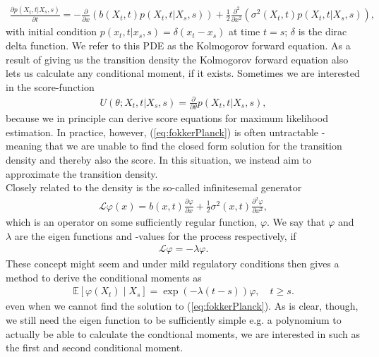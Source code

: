 \begin{align}
    \frac{\partial p(X_t, t | X_s, s)}{\partial t} = -\frac{\partial}{\partial x}\left(b(X_t, t)p(X_t, t | X_s, s)\right) + \frac{1}{2}\frac{\partial^2}{\partial x^2}\left(\sigma^2(X_t, t)p(X_t, t | X_s, s)\right),\label{eq:fokkerPlanck} 
\end{align}
with initial condition $p(x_t, t|x_s, s) = \delta(x_t - x_s)$ at time $t = s$; $\delta$ is the dirac delta function. We refer to this PDE as the Kolmogorov forward equation. As a result of giving us the transition density the Kolmogorov forward equation also lets us calculate any conditional moment, if it exists. Sometimes we are interested in the score-function
\begin{align}
    U(\theta; X_t, t | X_s, s) = \frac{\partial}{\partial\theta}p(X_t, t | X_s, s), \label{transitionScore}
\end{align}
because we in principle can derive score equations for maximum likelihood estimation. In practice, however, (\ref{eq:fokkerPlanck}) is often untractable - meaning that we are unable to find the closed form solution for the transition density and thereby also the score. In this situation, we instead aim to approximate the transition density. \\
Closely related to the density is the so-called infinitesemal generator 
\begin{align}
    \mathcal{L}\varphi(x) = b(x, t) \frac{\partial\varphi}{\partial x} + \frac{1}{2}\sigma^2(x, t)\frac{\partial^2\varphi}{\partial x^2} \label{eq:infinitesemalGeneratorDefinition},
\end{align}
which is an operator on some sufficiently regular function, $\varphi$. We say that $\varphi$ and $\lambda$ are the eigen functions and -values for the process respectively, if 
\begin{align}
    \mathcal{L}\varphi = -\lambda\varphi.
\end{align} 
These concept might seem 
and under mild regulatory conditions \cite[theorem 1.16]{StatisticalMethodsForSDE} then gives a method to derive the conditional moments as
\begin{align}
    \mathbb{E}\left[\varphi(X_{t}) \middle | X_{s}\right] = \exp\left(-\lambda \left(t - s\right)\right)\varphi \label{eq:momentConditions}, \quad t\geq s.
\end{align}
even when we cannot find the solution to (\ref{eq:fokkerPlanck}). As is clear, though, we still need the eigen function to be sufficiently simple e.g. a polynomium to actually be able to calculate the condtional moments, we are interested in such as the first and second conditional moment.

